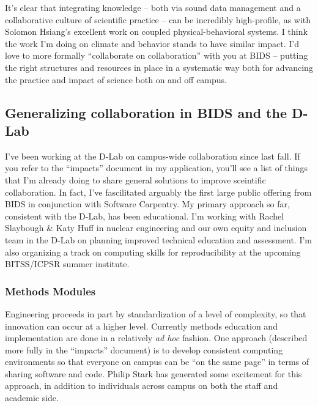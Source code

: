 It's clear that integrating knowledge -- both via sound data management and a
collaborative culture of scientific practice --  can be incredibly high-profile,
as with Solomon Hsiang's excellent work on coupled physical-behavioral systems.
I think the work I'm doing on climate and behavior stands to have similar
impact.  I'd love to more formally “collaborate on collaboration” with you at
BIDS -- putting the right structures and resources in place in a systematic way
both for advancing the practice and impact of science both on and off campus.

\subsection*{Generalizing collaboration in BIDS and the D-Lab}

I've been working at the D-Lab on campus-wide collaboration since last fall. If
you refer to the “impacts” document in my application, you'll see a list of
things that I'm already doing to share general solutions to improve sceintific
collaboration. In fact, I've fascilitated arguably the first large public
offering from BIDS in conjunction with Software Carpentry. My primary approach
so far, consistent with the D-Lab, has been educational. I'm working with Rachel
Slaybough \& Katy Huff in nuclear engineering and our own equity and inclusion
team in the D-Lab on planning improved technical education and assessment. I'm
also organizing a track on computing skills for reproducibility at the upcoming
BITSS/ICPSR summer institute.

\subsubsection*{Methods Modules}

Engineering proceeds in part by standardization of a level of complexity, so
that innovation can occur at a higher level. Currently methods education and
implementation are done in a relatively \emph{ad hoc} fashion. One approach
(described more fully in the “impacts” document) is to develop consistent
computing environments so that everyone on campus can be “on the same page” in
terms of sharing software and code. Philip Stark has generated some excitement
for this approach, in addition to individuals across campus on both the staff
and academic side.

